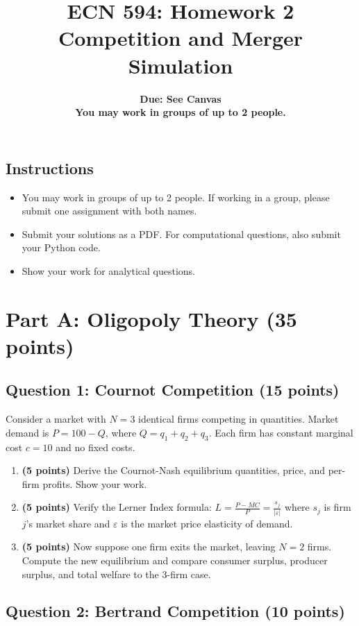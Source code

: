 \documentclass[11pt]{article}
\title{ECN 594: Homework 2 \\ \large{Competition and Merger Simulation}}
\author{\textbf{Due: See Canvas} \\
\textbf{You may work in groups of up to 2 people.}}
\date{}
\begin{document}
\maketitle

\subsection*{Instructions}
\begin{itemize}
\item You may work in groups of up to 2 people. If working in a group, please submit one assignment with both names.
\item Submit your solutions as a PDF. For computational questions, also submit your Python code.
\item Show your work for analytical questions.
\end{itemize}

\section*{Part A: Oligopoly Theory (35 points)}

\subsection*{Question 1: Cournot Competition (15 points)}

Consider a market with $N = 3$ identical firms competing in quantities. Market demand is $P = 100 - Q$, where $Q = q_1 + q_2 + q_3$. Each firm has constant marginal cost $c = 10$ and no fixed costs.

\begin{enumerate}
\item \textbf{(5 points)} Derive the Cournot-Nash equilibrium quantities, price, and per-firm profits. Show your work.

\item \textbf{(5 points)} Verify the Lerner Index formula: $L = \frac{P - MC}{P} = \frac{s_j}{|\varepsilon|}$ where $s_j$ is firm $j$'s market share and $\varepsilon$ is the market price elasticity of demand.

\item \textbf{(5 points)} Now suppose one firm exits the market, leaving $N = 2$ firms. Compute the new equilibrium and compare consumer surplus, producer surplus, and total welfare to the 3-firm case.
\end{enumerate}

\subsection*{Question 2: Bertrand Competition (10 points)}
\end{document}

